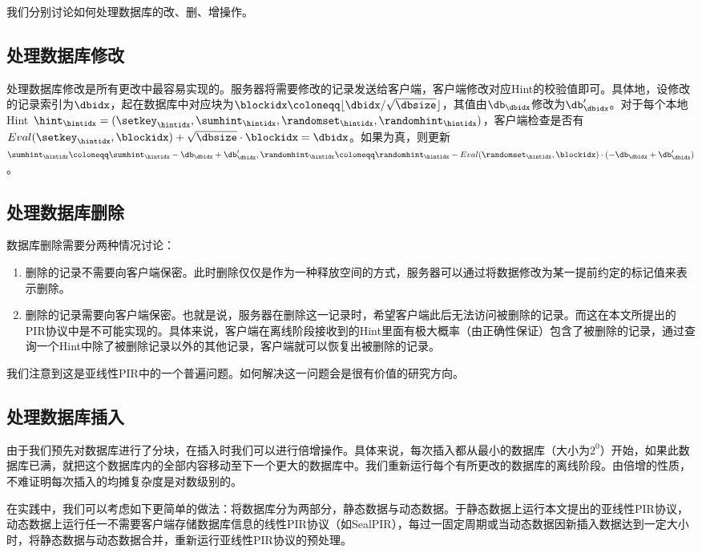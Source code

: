 我们分别讨论如何处理数据库的改、删、增操作。

\subsection{处理数据库修改}
处理数据库修改是所有更改中最容易实现的。服务器将需要修改的记录发送给客户端，客户端修改对应Hint的校验值即可。具体地，设修改的记录索引为$\dbidx$，起在数据库中对应块为$\blockidx\coloneqq \lfloor \dbidx/\sqrt{\dbsize}\rfloor$，其值由$\db_\dbidx$修改为$\db_\dbidx'$。对于每个本地Hint $\hint_\hintidx = (\setkey_\hintidx,\sumhint_\hintidx,\randomset_\hintidx,\randomhint_\hintidx)$，客户端检查是否有 $Eval(\setkey_\hintidx, \blockidx) + \sqrt{\dbsize}\cdot \blockidx = \dbidx $。如果为真，则更新$\sumhint_\hintidx \coloneqq \sumhint_\hintidx - \db_{\dbidx} + \db_{\dbidx}', \randomhint_\hintidx \coloneqq \randomhint_\hintidx - Eval(\randomset_\hintidx,\blockidx)\cdot(-\db_{\dbidx} + \db_{\dbidx}')$。

\subsection{处理数据库删除}
数据库删除需要分两种情况讨论：
\begin{enumerate}
    \item 删除的记录不需要向客户端保密。此时删除仅仅是作为一种释放空间的方式，服务器可以通过将数据修改为某一提前约定的标记值来表示删除。
    \item 删除的记录需要向客户端保密。也就是说，服务器在删除这一记录时，希望客户端此后无法访问被删除的记录。而这在本文所提出的PIR协议中是不可能实现的。具体来说，客户端在离线阶段接收到的Hint里面有极大概率（由正确性保证）包含了被删除的记录，通过查询一个Hint中除了被删除记录以外的其他记录，客户端就可以恢复出被删除的记录。
\end{enumerate}

我们注意到这是亚线性PIR中的一个普遍问题。如何解决这一问题会是很有价值的研究方向。

\subsection{处理数据库插入}
由于我们预先对数据库进行了分块，在插入时我们可以进行倍增操作。具体来说，每次插入都从最小的数据库（大小为$2^0$）开始，如果此数据库已满，就把这个数据库内的全部内容移动至下一个更大的数据库中。我们重新运行每个有所更改的数据库的离线阶段。由倍增的性质，不难证明每次插入的均摊复杂度是对数级别的。

在实践中，我们可以考虑如下更简单的做法：将数据库分为两部分，静态数据与动态数据。于静态数据上运行本文提出的亚线性PIR协议，动态数据上运行任一不需要客户端存储数据库信息的线性PIR协议（如SealPIR\cite{SP:ACLS18}），每过一固定周期或当动态数据因新插入数据达到一定大小时，将静态数据与动态数据合并，重新运行亚线性PIR协议的预处理。